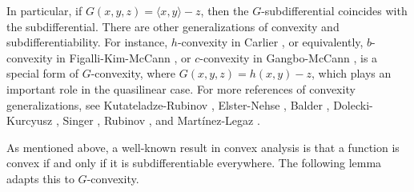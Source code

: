 			
			
			
In particular, if $G(x,y,z) = \langle x, y \rangle - z$, then the $G$-subdifferential coincides with the subdifferential. There are other generalizations of convexity and subdifferentiability. For instance, $h$-convexity in Carlier \cite{Carlier01}, or equivalently, $b$-convexity in Figalli-Kim-McCann \cite{FigalliKimMcCann11}, or $c$-convexity in  Gangbo-McCann \cite{GangboMcCann96}, is a special form of $G$-convexity, where $G(x,y,z)=  h(x,y) -z$, which plays an important role in the quasilinear case. For more references of convexity generalizations, see Kutateladze-Rubinov \cite{KutateladzeRubinov72}, Elster-Nehse \cite{ElsterNehse74}, Balder \cite{Balder77}, Dolecki-Kurcyusz \cite{DoleckiKurcyusz78},  Singer \cite{Singer97},  Rubinov \cite{Rubinov00a}, and Martínez-Legaz \cite{MartinezLegaz05}.\medskip
			
			
As mentioned above, a well-known result in convex analysis is that a function is convex if and only if it is subdifferentiable everywhere. The following lemma adapts this to $G$-convexity. \medskip
			
